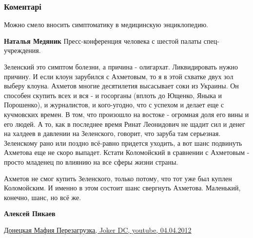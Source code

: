 
 
 
 
 
\subsubsection{Коментарі}

\begin{itemize} %
Можно смело вносить симптоматику в медицинскую энциклопедию.

\begin{itemize} %
\textbf{Наталья Медяник} Пресс-конференция человека с шестой палаты спец-учреждения.
\end{itemize} %


Зеленский это симптом болезни, а причина - олигархат. Ликвидировать нужно
причину. И если клоун зарубился с Ахметовым, то я в этой схватке двух зол
выберу клоуна. Ахметов многие десятилетия высасывает соки из Украины. Он
способен скупить всех и вся - и госорганы (вплоть до Ющенко, Яныка и
Порошенко), и журналистов, и кого-угодно, что с успехом и делает еще с
кучмовских времен. В том, что произошло на востоке - огромная доля его вины и
его людей. А то, как в последнее время Ринат Леонидович не щадит сил и денег на
халдеев в давлении на Зеленского, говорит, что заруба там серьезная. Зеленскому
рано или поздно всё-равно придется уходить, а вот шанс подвинуть Ахметова еще
не скоро выпадет. Кстати Коломойский в сравнении с Ахметовым - просто младенец
по влиянию на все сферы жизни страны.

\begin{itemize} %

Ахметов не смог купить Зеленского, только потому, что тот уже был куплен
Коломойским. И именно в этом состоит шанс свергнуть Ахметова. Маленький,
конечно, шанс, но всё же.

\textbf{Алексей Пикаев} 

\href{https://youtu.be/eANxxUQhHtU}{%
Донецкая Мафия Перезагрузка, Joker DC, youtube, 04.04.2012%
}

\end{itemize} %


\end{itemize}
